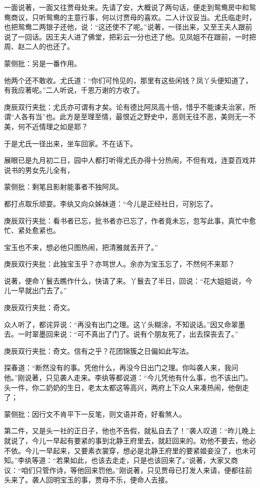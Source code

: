\begin{parag}
    一面说著，一面又往贾母处来。先请了安，大概说了两句话，便走到鸳鸯房中和鸳鸯商议，只听鸳鸯的主意行事，何以讨贾母的喜欢。二人计议妥当。尤氏临走时，也把鸳鸯二两银子还他，说：“这还使不了呢。”说著，一径出来，又至王夫人跟前说了一回话。因王夫人进了佛堂，把彩云一分也还了他。见凤姐不在跟前，一时把周、赵二人的也还了。\begin{note}蒙侧批：另是一番作用。\end{note}他两个还不敢收。尤氏道：“你们可怜见的，那里有这些闲钱？凤丫头便知道了，有我应著呢。”二人听说，千恩万谢的方收了。\begin{note}庚辰双行夹批：尤氏亦可谓有才矣。论有德比阿凤高十倍，惜乎不能谏夫治家，所谓“人各有当”也。此方是至理至情，最恨近之野史中，恶则无往不恶，美则无一不美，何不近情理之如是耶？\end{note}于是尤氏一径出来，坐车回家。不在话下。
\end{parag}


\begin{parag}
    展眼已是九月初二日，园中人都打听得尤氏办得十分热闹，不但有戏，连耍百戏并说书的男女先儿全有，\begin{note}蒙侧批：剩笔且影射能事者不独阿凤。\end{note}都打点取乐顽耍。李纨又向众姊妹道：“今儿是正经社日，可别忘了。\begin{note}庚辰双行夹批：看书者已忘，批书者亦已忘了，作者竟未忘，忽写此事，真忙中愈忙、紧处愈紧也。\end{note}宝玉也不来，想必他只图热闹，把清雅就丢开了。”\begin{note}庚辰双行夹批：此独宝玉乎？亦骂世人。余亦为宝玉忘了，不然何不来耶？\end{note}说著，便命丫鬟去瞧作什么，快请了来。丫鬟去了半日，回说：“花大姐姐说，今儿一早就出门去了。”\begin{note}庚辰双行夹批：奇文。\end{note}众人听了，都诧异说：“再没有出门之理。这丫头糊涂，不知说话。”因又命翠墨去。一时翠墨回来说：“可不真出了门了。说有个朋友死了，出去探丧去了。”\begin{note}庚辰双行夹批：奇文。信有之乎？花团锦簇之日偏如此写法。\end{note}探春道：“断然没有的事。凭他什么，再没今日出门之理。你叫袭人来，我问他。”刚说著，只见袭人走来。李纨等都说道：“今儿凭他有什么事，也不该出门。头一件，你二奶奶的生日，老太太都这等高兴，两府上下众人来凑热闹，他倒走了；\begin{note}蒙侧批：因行文不肯平下一反笔，则文语并奇，好看煞人。\end{note}第二件，又是头一社的正日子，他也不告假，就私自去了！”袭人叹道：“昨儿晚上就说了，今儿一早起有要紧的事到北静王府里去，就赶回来的。劝他不要去，他必不依。今儿一早起来，又要素衣裳穿，想必是北静王府里的要紧姬妾没了，也未可知。”李纨等道：“若果如此，也该去走走，只是也该回来了。”说著，大家又商议：“咱们只管作诗，等他回来罚他。”刚说著，只见贾母已打发人来请，便都往前头来了。袭人回明宝玉的事，贾母不乐，便命人去接。
\end{parag}


